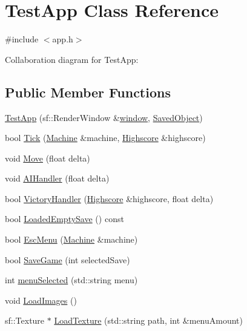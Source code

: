 \hypertarget{classTestApp}{}\section{Test\+App Class Reference}
\label{classTestApp}


{\ttfamily \#include $<$app.\+h$>$}



Collaboration diagram for Test\+App\+:
\subsection*{Public Member Functions}
\begin{DoxyCompactItemize}
\item 
\hyperlink{classTestApp_a1ddfbbb316862f9ec3521f5075eb6237}{Test\+App} (sf\+::\+Render\+Window \&\hyperlink{classTestApp_a0b6b080a777092db64519ef7c4309105}{window}, \hyperlink{classSavedObject}{Saved\+Object})
\item 
bool \hyperlink{classTestApp_ad88b50dae7495c7e5e6ff81458784edd}{Tick} (\hyperlink{classMachine}{Machine} \&machine, \hyperlink{classHighscore}{Highscore} \&highscore)
\item 
void \hyperlink{classTestApp_adc890b5783272130ecf773679a98420f}{Move} (float delta)
\item 
void \hyperlink{classTestApp_ab9857d08c014beec5b30d428a011bd85}{A\+I\+Handler} (float delta)
\item 
bool \hyperlink{classTestApp_a5de81fdea5866c4c36f23b5cdb149895}{Victory\+Handler} (\hyperlink{classHighscore}{Highscore} \&highscore, float delta)
\item 
bool \hyperlink{classTestApp_a59a5d0591aa4f0aa7a8333ba343539d8}{Loaded\+Empty\+Save} () const 
\item 
bool \hyperlink{classTestApp_a8be9a4cd8c6569abb8aa55f992db3171}{Esc\+Menu} (\hyperlink{classMachine}{Machine} \&machine)
\item 
bool \hyperlink{classTestApp_a7587d5d406f551d0cb79f0e9846356ef}{Save\+Game} (int selected\+Save)
\item 
int \hyperlink{classTestApp_a862305fac02e0df9153d6ff0c02b671e}{menu\+Selected} (std\+::string menu)
\item 
void \hyperlink{classTestApp_a9ca5b1337188dbe749a999a46a8ad083}{Load\+Images} ()
\item 
sf\+::\+Texture $\ast$ \hyperlink{classTestApp_a9788d85fc87f78c345907810dc56d062}{Load\+Texture} (std\+::string path, int \&menu\+Amount)
\end{DoxyCompactItemize}
